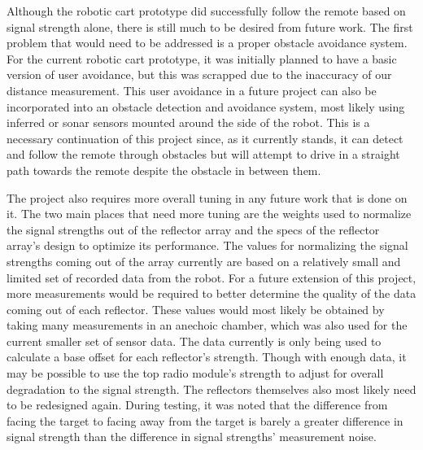 Although the robotic cart prototype did successfully follow the remote based on signal strength alone, there is still much to be desired from future work.  The first problem that would need to be addressed is a proper obstacle avoidance system.  For the current robotic cart prototype, it was initially planned to have a basic version of user avoidance, but this was scrapped due to the inaccuracy of our distance measurement.  This user avoidance in a future project can also be incorporated into an obstacle detection and avoidance system, most likely using inferred or sonar sensors mounted around the side of the robot.  This is a necessary continuation of this project since, as it currently stands, it can detect and follow the remote through obstacles but will attempt to drive in a straight path towards the remote despite the obstacle in between them.
\par{}
The project also requires more overall tuning in any future work that is done on it.  The two main places that need more tuning are the weights used to normalize the signal strengths out of the reflector array and the specs of the reflector array's design to optimize its performance.  The values for normalizing the signal strengths coming out of the array currently are based on a relatively small and limited set of recorded data from the robot.  For a future extension of this project, more measurements would be required to better determine the quality of the data coming out of each reflector.  These values would most likely be obtained by taking many measurements in an anechoic chamber, which was also used for the current smaller set of sensor data.  The data currently is only being used to calculate a base offset for each reflector's strength. Though with enough data, it may be possible to use the top radio module's strength to adjust for overall degradation to the signal strength.  The reflectors themselves also most likely need to be redesigned again. During testing, it was noted that the difference from facing the target to facing away from the target is barely a greater difference in signal strength than the difference in signal strengths' measurement noise.
\par{}
